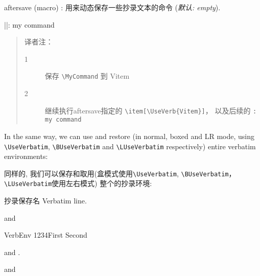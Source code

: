 \documentclass[twoside]{article}
\newcommand\cs[1]{\texttt{\textbackslash#1}}
\providecommand\optname[1]{\textsf{#1}}
\newenvironment{optlist}{\begin{description}%
  \renewcommand\makelabel[1]{%
    \descriptionlabel{\mdseries\optname{##1}}}%
  \itemsep0.25\itemsep}%
 {\end{description}}
\begin{document}
\begin{optlist}
  \item[aftersave (macro)]: 用来动态保存一些抄录文本的命令
  (\emph{默认: empty}).
\end{optlist}

\begin{SideBySideExample}
  \newcommand{\Vitem}{%
    }
  \DefineShortVerb{\|}
  \begin{description}
    \Vitem|\MyCommand|: my command
  \end{description}
\end{SideBySideExample}

\begin{quotation}
译者注：
\begin{description}
  \item[1] 保存 \verb|\MyCommand| 到 Vitem
  \item[2] 继续执行aftersave指定的 \verb|\item[\UseVerb{Vitem}]|， 以及后续的 \verb|: my command|
\end{description}
\end{quotation}

  In the same way, we can use and restore (in normal, boxed and LR mode,
using \cs{UseVerbatim}, \cs{BUseVerbatim} and \cs{LUseVerbatim} respectively)
entire verbatim environments:

  同样的, 我们可以保存和取用(盒模式使用\cs{UseVerbatim}, \cs{BUseVerbatim}，\cs{LUseVerbatim}使用左右模式)
整个的抄录环境:

\begin{SideBySideExample}
  \begin{SaveVerbatim}{抄录保存名}
    Verbatim line.
  \end{SaveVerbatim}
  and 
\end{SideBySideExample}

\begin{SideBySideExample}
  \begin{SaveVerbatim}[gobble=5]%
    {VerbEnv}
1234First
    Second
  \end{SaveVerbatim}

  and .

   and
\end{SideBySideExample}
\end{document}
